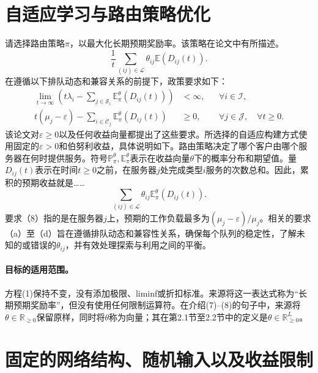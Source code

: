 \documentclass{article}
\begin{document}
\section*{自适应学习与路由策略优化}

请选择路由策略$\pi$，以最大化长期预期奖励率。该策略在论文中有所描述。
\begin{equation}
\frac{1}{t}\sum_{(ij)\in\mathcal L}\theta_{ij}\mathbb E(D_{ij}(t)).
\tag{1}
\end{equation}
在遵循以下排队动态和兼容关系的前提下，政策要求如下：
\begin{align}
\lim_{t\to\infty}\left(t\lambda_i-\sum_{j\in\mathcal S_i}\mathbb E^\theta_\pi(D_{ij}(t))\right)&<\infty,
&&\forall i\in\mathcal I,\tag{7}\\
t(\mu_j-\varepsilon)-\sum_{i\in\mathcal C_j}\mathbb E^\theta_\pi(D_{ij}(t))&\geq0,
&&\forall j\in\mathcal J,\quad\forall t\geq0.\tag{8}
\end{align}
该论文对$\varepsilon\geq0$以及任何收益向量都提出了这些要求。所选择的自适应构建方式使用固定的$\varepsilon>0$和伯努利收益，具体说明如下。路由策略决定了哪个客户由哪个服务器在何时提供服务。符号$\mathbb P^\theta_\pi,\mathbb E^\theta_\pi$表示在收益向量$\theta$下的概率分布和期望值。量$D_{ij}(t)$表示在时间$t\geq0$之前，在服务器$j$处完成类型$i$服务的次数总和。因此，累积的预期收益就是……
\begin{equation}
\sum_{(ij)\in\mathcal L}\theta_{ij}\mathbb E^\theta_\pi(D_{ij}(t)).
\tag{9}
\end{equation}
要求（8）指的是在服务器$j$上，预期的工作负载最多为$(\mu_j-\varepsilon)/\mu_j$。相关的要求（a）至（d）旨在遵循排队动态和兼容性关系，确保每个队列的稳定性，了解未知的或错误的$\theta_{ij}$，并有效处理探索与利用之间的平衡。

\paragraph{目标的适用范围。}
方程(1)保持不变，没有添加极限、liminf或折扣标准。来源将这一表达式称为“长期预期奖励率”，但没有使用任何限制运算符。在介绍(7)--(8)的句子中，来源将$\theta\in\mathbb R_{\geq0}$保留原样，同时将$\theta$称为向量；其在第2.1节至2.2节中的定义是$\theta\in\mathbb R_{\geq0}^{L}$。

\section*{固定的网络结构、随机输入以及收益限制}
\end{document}
